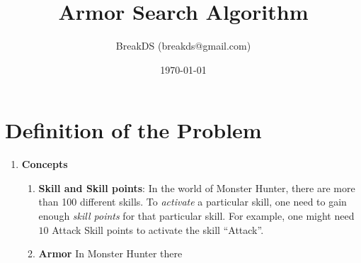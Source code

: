 \documentclass[a4paper,12pt]{article}
\title{Armor Search Algorithm}
\author{BreakDS (breakds@gmail.com)}
\date{\today}
\begin{document}
\maketitle

\section{Definition of the Problem}
\begin{enumerate}
\item \textbf{Concepts} 
  \begin{enumerate}
  \item \textbf{Skill and Skill points}: In the world of Monster
    Hunter, there are more than 100 different skills. To
    \emph{activate} a particular skill, one need to gain enough
    \emph{skill points} for that particular skill. For example, one
    might need $10$ Attack Skill points to activate the skill
    ``Attack''.
  \item \textbf{Armor} In Monster Hunter there 
  \end{enumerate}

\end{enumerate}
\end{document}
